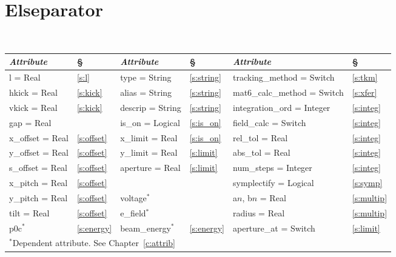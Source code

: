 \section{Elseparator}
\label{s:elsep}

\begin{center}
\tt
\begin{tabular}{|l|l||l|l||l|l|} \hline
  {\sl Attribute} & \S  & {\sl Attribute} & \S & {\sl Attribute} & \S \\ \hline
  l        = Real    & \ref{s:l}      & type = String    & \ref{s:string} & tracking\_method = Switch   & \ref{s:tkm}    \\ \hline
  hkick    = Real    & \ref{s:kick}   & alias = String   & \ref{s:string} & mat6\_calc\_method = Switch & \ref{s:xfer}   \\ \hline
  vkick    = Real    & \ref{s:kick}   & descrip = String & \ref{s:string} & integration\_ord = Integer  & \ref{s:integ}  \\ \hline
  gap      = Real    &                & is\_on = Logical & \ref{s:is_on}  & field\_calc = Switch        & \ref{s:integ}  \\ \hline
  x\_offset  = Real  & \ref{s:offset} & x\_limit = Real  & \ref{s:is_on}  & rel\_tol = Real             & \ref{s:integ}  \\ \hline
  y\_offset  = Real  & \ref{s:offset} & y\_limit = Real  & \ref{s:limit}  & abs\_tol = Real             & \ref{s:integ}  \\ \hline
  s\_offset  = Real  & \ref{s:offset} & aperture = Real  & \ref{s:limit}  & num\_steps = Integer        & \ref{s:integ}  \\ \hline
  x\_pitch = Real    & \ref{s:offset} &                  &                & symplectify = Logical       & \ref{s:symp}   \\ \hline
  y\_pitch = Real    & \ref{s:offset} & voltage$^*$      &                & a$n$, b$n$ = Real           & \ref{s:multip} \\ \hline
  tilt     = Real    & \ref{s:offset} & e\_field$^*$     &                & radius = Real               & \ref{s:multip} \\ \hline
  p0c$^*$            & \ref{s:energy} & beam\_energy$^*$ & \ref{s:energy} & aperture\_at = Switch       & \ref{s:limit}  \\ \hline
  \multicolumn{6}{l}{\small $^*$Dependent attribute. See Chapter~\ref{c:attrib}} \\
\end{tabular}
\end{center}
\toffset

